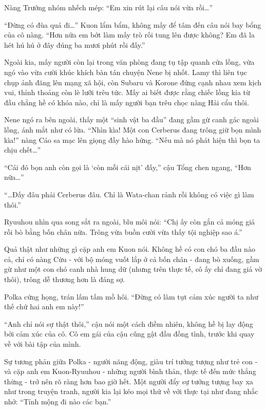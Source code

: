 \documentclass[../main.tex]{subfiles}
\begin{document}
Nàng Trưởng nhóm nhếch mép: ``Em xin rút lại câu nói vừa rồi\dots''

``Đừng có đùa quá đi\dots'' Kuon lẩm bẩm, không mấy để tâm đến câu nói bay bổng của cô nàng. ``Hơn nữa em bớt làm mấy trò rối tung lên được không? Em đã la hét hú hú ở đây đúng ba mươi phút rồi đấy.''

Ngoài kia, mấy người còn lại trong văn phòng đang tụ tập quanh cửa lồng, vừa ngó vào vừa cười khúc khích bàn tán chuyện Nene bị nhốt. Lamy thì liên tục chụp ảnh đăng lên mạng xã hội, còn Subaru và Korone đứng cạnh nhau xem kịch vui, thỉnh thoảng còn lè lưỡi trêu tức. Mấy ai biết được rằng chiếc lồng kia từ đầu chẳng hề có khóa nào, chỉ là mấy người bạn trêu chọc nàng Hải cẩu thôi.

Nene ngó ra bên ngoài, thấy một ``sinh vật ba đầu'' đang gầm gừ canh gác ngoài lồng, ánh mắt như có lửa. ``Nhìn kìa! Một con Cerberus đang trông giữ bọn mình kìa!'' nàng Cáo sa mạc lên giọng đầy hào hứng. ``Nếu mà nó phát hiện thì bọn ta chịu chết\dots''

``Cái đó bọn anh còn gọi là `còn mỗi cái nịt' đấy,'' cậu Tổng chen ngang, ``Hơn nữa\dots''


``\dots Đấy đâu phải Cerberus đâu. Chỉ là Wata-chan rảnh rỗi không có việc gì làm thôi.''

Ryuuhou nhìn qua song sắt ra ngoài, bĩu môi nói: ``Chị ấy còn gắn cả móng giả rồi bò bằng bốn chân nữa. Trông vừa buồn cười vừa thấy tội nghiệp sao á.''

Quả thật như những gì cặp anh em Kuon nói. Không hề có con chó ba đầu nào cả, chỉ có nàng Cừu - với bộ móng vuốt lắp ở cả bốn chân - đang bò xuống, gầm gừ như một con chó canh nhà hung dữ (nhưng trên thực tế, cô ấy chỉ đang giả vờ thôi), trông dễ thương hơn là đáng sợ.

Polka cứng họng, trán lấm tấm mồ hôi. ``Đừng có làm tụt cảm xúc người ta như thế chứ hai anh em này!''

``Anh chỉ nói sự thật thôi,'' cậu nói một cách điềm nhiên, không hề bị lay động bởi cảm xúc của cô. Cô em gái của cậu cũng gật đầu đồng tình, trước khi quay về với bài tập của mình.

Sự tương phản giữa Polka - người năng động, giàu trí tưởng tượng như trẻ con - và cặp anh em Kuon-Ryuuhou - những người bình thản, thực tế đến mức thẳng thừng - trở nên rõ ràng hơn bao giờ hết. Một người đẩy sự tưởng tượng bay xa như trong truyện tranh, người kia lại kéo mọi thứ về với thực tại như đang nhắc nhở: ``Tỉnh mộng đi nào các bạn.''
\end{document}
